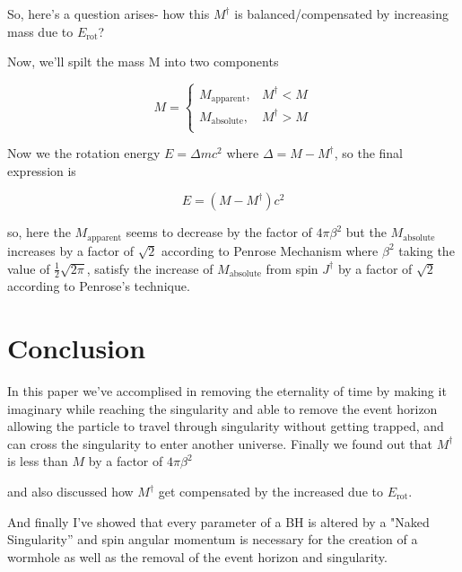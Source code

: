 \documentclass{article}
\begin{document}
So, here's a question arises- how this $M^\dagger$ is balanced/compensated by increasing mass due to $E_\text{rot}$?

Now, we'll spilt the mass M into two components

\begin{equation}
    M = \begin{cases}
M_\text{apparent}, & M^\dagger < M \\
M_\text{absolute}, & M^\dagger > M \\
\end{cases}
\label{5}
\end{equation}

Now we the rotation energy $E=\Delta m c^2$ where $\Delta= M- M^\dagger$,
so the final expression is

$$ E= (M- M^\dagger) c^2$$

so, here the $M_\text{apparent}$ seems to decrease by the factor of $4\pi\beta^2$ but the $M_\text{absolute} $ increases by a factor of $\sqrt {2}$ according to Penrose Mechanism where $\beta^2$ taking the value of $\frac{1}{2} \sqrt{2\pi}$, satisfy the increase of $M_\text{absolute}$ from spin $J^\dagger$ by a factor of $\sqrt{2}$ according to Penrose's technique.

\section{\Large Conclusion}

In this paper we've accomplised in removing the eternality of time by making it imaginary while reaching the singularity and able to remove the event horizon allowing the particle to travel through singularity without getting trapped, and can cross the singularity to enter another universe.
Finally we found out that $M^\dagger$ is less than $M$ by a factor of $4\pi\beta^2$

and also discussed how  $M^\dagger$ get compensated by the increased due to $E_\text{rot}$.

And finally I've showed that every parameter of a BH is altered by a "Naked
Singularity” and spin angular momentum is necessary for the creation of a wormhole as well as the removal of the event horizon
and singularity.
\end{document}
